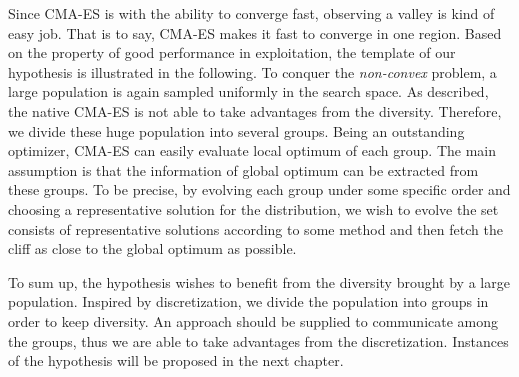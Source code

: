                     Since CMA-ES is with the ability to converge fast,
                    observing a valley is kind of easy job.  That is to
                    say, CMA-ES makes it fast to converge in one region.
                    Based on the property of good performance in
                    exploitation, the template of our hypothesis is
                    illustrated in the following.  To conquer the
                    \emph{non-convex} problem, a large population is
                    again sampled uniformly in the search space.  As
                    described, the native CMA-ES is not able to take
                    advantages from the diversity.  Therefore, we divide
                    these huge population into several groups.  Being an
                    outstanding optimizer, CMA-ES can easily evaluate
                    local optimum of each group.  The main assumption is
                    that the information of global optimum can be
                    extracted from these groups.  To be precise, by
                    evolving each group under some specific order and
                    choosing a representative solution for the
                    distribution, we wish to evolve the set consists of
                    representative solutions according to some method
                    and then fetch the cliff as close to the global
                    optimum as possible.

                    To sum up, the hypothesis wishes to benefit from the
                    diversity brought by a large population.  Inspired
                    by discretization, we divide the population into
                    groups in order to keep diversity.  An approach
                    should be supplied to communicate among the groups,
                    thus we are able to take advantages from the
                    discretization. Instances of the hypothesis will be
                    proposed in the next chapter.  
